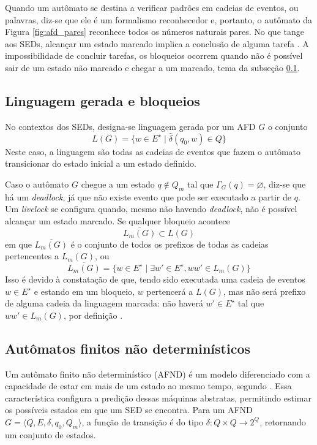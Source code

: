 Quando um autômato se destina a verificar padrões em cadeias de eventos, ou palavras, diz-se que ele é um formalismo reconhecedor \cite{menezes} e, portanto, o autômato da Figura \ref{fig:afd_pares} reconhece todos os números naturais pares. No que tange aos \acs{SED}s, alcançar um estado marcado implica a conclusão de alguma tarefa \cite{cassandras}. A impossibilidade de concluir tarefas, os bloqueios ocorrem quando não é possível sair de um estado não marcado e chegar a um marcado, tema da subseção \ref{subsec:ling_ger}.

\subsection{Linguagem gerada e bloqueios}
\label{subsec:ling_ger}

No contextos dos SEDs, designa-se linguagem gerada por um AFD $G$ o conjunto $$L(G) = \{ w \in E^\star \mid \hat{\delta}(q_0, w) \in Q \}$$ Neste caso, a linguagem são todas as cadeias de eventos que fazem o autômato transicionar do estado inicial a um estado definido.

Caso o autômato $G$ chegue a um estado $q \not\in Q_m$ tal que $\Gamma_G(q) = \varnothing$, diz-se que há um \textit{deadlock}, já que não existe evento que pode ser executado a partir de $q$. Um \textit{livelock} se configura quando, mesmo não havendo \textit{deadlock}, não é possível alcançar um estado marcado. Se qualquer bloqueio acontece $$\overline{L_m(G)} \subset L(G)$$ em que $\overline{L_m(G)}$ é o conjunto de todos os prefixos de todas as cadeias pertencentes a $L_m(G)$, ou $$\overline{L_m(G)} = \{ w \in E^\star \mid \exists w' \in E^\star, w w' \in L_m(G) \}$$ Isso é devido à constatação de que, tendo sido executada uma cadeia de eventos $w \in E^\star$ e estando em um bloqueio, $w$ pertencerá a $L(G)$, mas não será prefixo de alguma cadeia da linguagem marcada: não haverá $w' \in E^\star$ tal que $ww' \in L_m(G)$, por definição \cite{cassandras}.

\subsection{Autômatos finitos não determinísticos}

Um autômato finito não determinístico (\acs{AFND}) é um modelo diferenciado com a capacidade de estar em mais de um estado ao mesmo tempo, segundo . Essa característica configura a predição dessas máquinas abstratas, permitindo estimar os possíveis estados em que um SED se encontra. Para um AFND $G = \langle Q, E, \delta, q_0, Q_m \rangle$, a função de transição é do tipo $\delta : Q \times Q \to 2^Q$, retornando um conjunto de estados.

